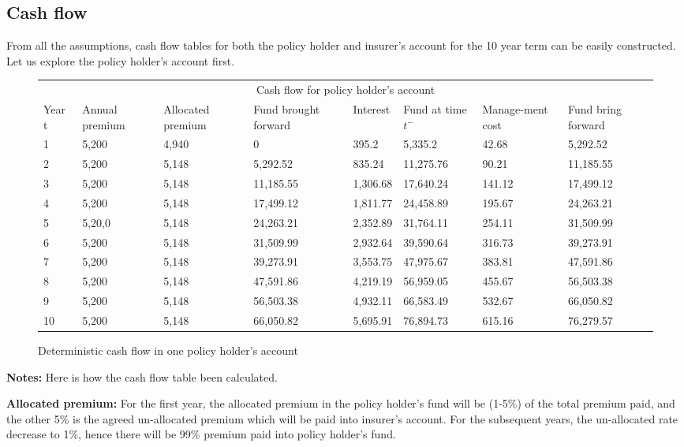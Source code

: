 \documentclass{report}
\begin{document}
\subsection{Cash flow}

From all the assumptions, cash flow tables for both the policy holder and insurer's account for the  10 year term can be easily constructed. Let us explore the policy holder's account first. 



\begin{figure}[H]
    \centering
\begin{tabular}{p{1cm} p{1.5cm} p{1.5cm} p{2cm} p{1.5cm} p{2cm} p{1.5cm} p{1.5cm} }
\toprule
\multicolumn{8}{c}{Cash flow for policy holder's account} \\
\cmidrule(r){3-7}

Year t & Annual premium & Allocated premium & Fund brought forward & Interest & Fund at time $t^-$ & Manage-ment cost & Fund bring forward \\
\midrule
1	&5,200	&4,940	&0&	395.2	&5,335.2	&42.68	&5,292.52\\
2	&5,200	&5,148	&5,292.52	 &   835.24	&11,275.76 &	90.21	&11,185.55\\
3	&5,200	&5,148	&11,185.55&  1,306.68	&17,640.24	&141.12  &17,499.12\\
4&	5,200	&5,148	&17,499.12&  1,811.77&	24,458.89	&    195.67       &24,263.21\\
5&	5,20,0	&5,148&	24,263.21	&    2,352.89&	31,764.11	&   254.11	&31,509.99\\
6&	5,200	&5,148&	31,509.99	&   2,932.64&	39,590.64	&   316.73	&39,273.91\\
7&	5,200	&5,148&	39,273.91	&   3,553.75&	47,975.67	&   383.81	&47,591.86\\
8&	5,200	&5,148&	47,591.86	&   4,219.19&	56,959.05	&  455.67	    &56,503.38\\
9&	5,200	&5,148&	56,503.38	&   4,932.11&	66,583.49	&  532.67 	&66,050.82\\
10&	5,200	&5,148	&66,050.82	&5,695.91	&76,894.73	&615.16	&76,279.57\\
\bottomrule
\end{tabular}
\label{determ-PHcashflow}
\caption{Deterministic cash flow in one policy holder's account}
\end{figure}




\textbf{Notes:} Here is how the cash flow table been calculated.

\textbf{Allocated premium:} For the first year, the allocated premium in the policy holder's fund will be (1-5\%) of the total premium paid, and the other 5\% is the agreed un-allocated premium which will be paid into insurer's account. For the subsequent years, the un-allocated rate decrease to 1\%, hence there will be 99\% premium paid into policy holder's fund.
\end{document}
